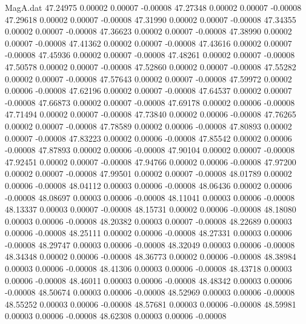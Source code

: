 \begin{filecontents}{MagA.dat}
  47.24975    0.00002    0.00007   -0.00008
  47.27348    0.00002    0.00007   -0.00008
  47.29618    0.00002    0.00007   -0.00008
  47.31990    0.00002    0.00007   -0.00008
  47.34355    0.00002    0.00007   -0.00008
  47.36623    0.00002    0.00007   -0.00008
  47.38990    0.00002    0.00007   -0.00008
  47.41362    0.00002    0.00007   -0.00008
  47.43616    0.00002    0.00007   -0.00008
  47.45936    0.00002    0.00007   -0.00008
  47.48261    0.00002    0.00007   -0.00008
  47.50578    0.00002    0.00007   -0.00008
  47.52860    0.00002    0.00007   -0.00008
  47.55282    0.00002    0.00007   -0.00008
  47.57643    0.00002    0.00007   -0.00008
  47.59972    0.00002    0.00006   -0.00008
  47.62196    0.00002    0.00007   -0.00008
  47.64537    0.00002    0.00007   -0.00008
  47.66873    0.00002    0.00007   -0.00008
  47.69178    0.00002    0.00006   -0.00008
  47.71494    0.00002    0.00007   -0.00008
  47.73840    0.00002    0.00006   -0.00008
  47.76265    0.00002    0.00007   -0.00008
  47.78589    0.00002    0.00006   -0.00008
  47.80893    0.00002    0.00007   -0.00008
  47.83223    0.00002    0.00006   -0.00008
  47.85542    0.00002    0.00006   -0.00008
  47.87893    0.00002    0.00006   -0.00008
  47.90104    0.00002    0.00007   -0.00008
  47.92451    0.00002    0.00007   -0.00008
  47.94766    0.00002    0.00006   -0.00008
  47.97200    0.00002    0.00007   -0.00008
  47.99501    0.00002    0.00007   -0.00008
  48.01789    0.00002    0.00006   -0.00008
  48.04112    0.00003    0.00006   -0.00008
  48.06436    0.00002    0.00006   -0.00008
  48.08697    0.00003    0.00006   -0.00008
  48.11041    0.00003    0.00006   -0.00008
  48.13337    0.00003    0.00007   -0.00008
  48.15731    0.00002    0.00006   -0.00008
  48.18080    0.00003    0.00006   -0.00008
  48.20382    0.00003    0.00007   -0.00008
  48.22689    0.00003    0.00006   -0.00008
  48.25111    0.00002    0.00006   -0.00008
  48.27331    0.00003    0.00006   -0.00008
  48.29747    0.00003    0.00006   -0.00008
  48.32049    0.00003    0.00006   -0.00008
  48.34348    0.00002    0.00006   -0.00008
  48.36773    0.00002    0.00006   -0.00008
  48.38984    0.00003    0.00006   -0.00008
  48.41306    0.00003    0.00006   -0.00008
  48.43718    0.00003    0.00006   -0.00008
  48.46011    0.00003    0.00006   -0.00008
  48.48342    0.00003    0.00006   -0.00008
  48.50674    0.00003    0.00006   -0.00008
  48.52969    0.00003    0.00006   -0.00008
  48.55252    0.00003    0.00006   -0.00008
  48.57681    0.00003    0.00006   -0.00008
  48.59981    0.00003    0.00006   -0.00008
  48.62308    0.00003    0.00006   -0.00008

\end{filecontents}
